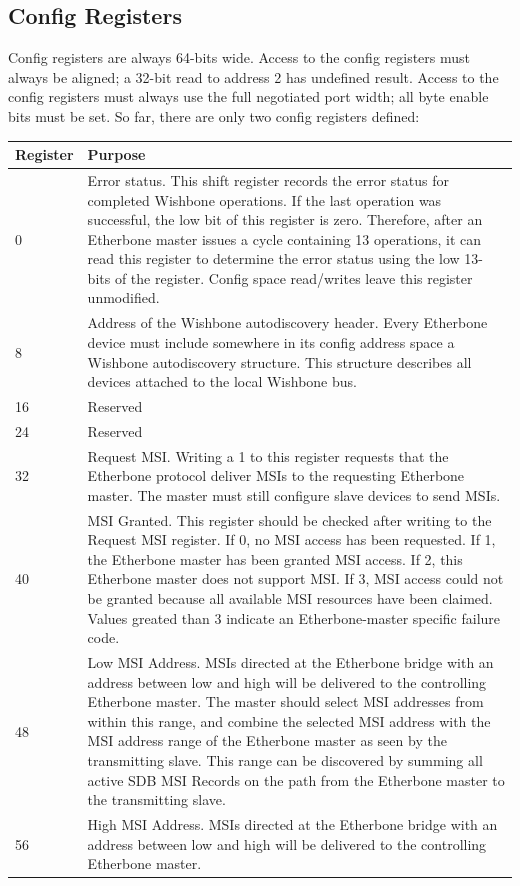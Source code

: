 \documentclass{article}
\begin{document}
\subsection{Config Registers}
\label{sec:config}

Config registers are always 64-bits wide.
Access to the config registers must always be aligned;
a 32-bit read to address 2 has undefined result.
Access to the config registers must always use the full negotiated port width;
all byte enable bits must be set.
So far, there are only two config registers defined:

\begin{tabular}{|l|p{}|}
\hline
Register & Purpose \\
\hline
0 &
Error status.
This shift register records the error status for completed Wishbone
operations.
If the last operation was successful,
the low bit of this register is zero.
Therefore, 
after an Etherbone master issues a cycle containing 13 operations,
it can read this register to determine the error status using the low
13-bits of the register.
Config space read/writes leave this register unmodified.
\\
\hline
8 &
Address of the Wishbone autodiscovery header.
Every Etherbone device must include somewhere in its config address space
a Wishbone autodiscovery structure.
This structure describes all devices attached to the local Wishbone bus.
\\
\hline
16 &
Reserved
\\
\hline
24 &
Reserved
\\
\hline
32 &
Request MSI. 
Writing a 1 to this register requests that the Etherbone protocol deliver MSIs
to the requesting Etherbone master.
The master must still configure slave devices to send MSIs.
\\
\hline
40 &
MSI Granted.
This register should be checked after writing to the Request MSI register.
If 0, no MSI access has been requested.
If 1, the Etherbone master has been granted MSI access.
If 2, this Etherbone master does not support MSI.
If 3, MSI access could not be granted because all available MSI resources have been claimed.
Values greated than 3 indicate an Etherbone-master specific failure code.
\\
\hline
48 &
Low MSI Address.
MSIs directed at the Etherbone bridge with an address between low and high
will be delivered to the controlling Etherbone master. The master should
select MSI addresses from within this range, and combine the selected MSI
address with the MSI address range of the Etherbone master as seen by the
transmitting slave. This range can be discovered by summing all active SDB
MSI Records on the path from the Etherbone master to the transmitting slave.
\\
\hline
56 &
High MSI Address.
MSIs directed at the Etherbone bridge with an address between low and high
will be delivered to the controlling Etherbone master.
\\
\hline
\end{tabular}
\end{document}

